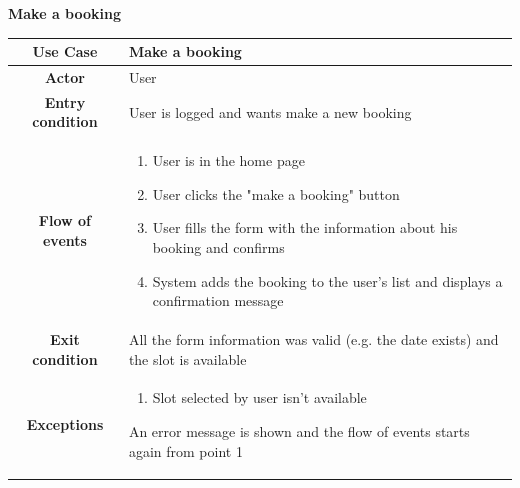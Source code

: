 \documentclass[table, 12pt]{article} %
\begin{document}
\begin{itemize}
            \begin{table}[H]
                \item[] \textbf{Make a booking}
                \item[]
                \centering
                \begin{tabular}{|c |m{}|}
                    \hline
                    \textbf{Use Case} & Make a booking\\ \hline
                    \textbf{Actor} & User\\ \hline
                    \textbf{Entry condition} & User is logged and wants make a new booking\\  \hline
                    \textbf{Flow of events} & \begin{enumerate}
                                                \item User is in the home page
                                                \item User clicks the "make a booking" button
                                                \item User fills the form with the information about his booking and confirms
                                                \item System adds the booking to the user's list and displays a confirmation message
                                            \end{enumerate}\\ \hline
                    \textbf{Exit condition} & All the form information was valid (e.g. the date exists) and the slot is available  \\ \hline
                    \textbf{Exceptions} &  \begin{enumerate}
                        \item Slot selected by user isn't available
                    \end{enumerate}
                    An error message is shown and the flow of events starts again from point 1\\ \hline
                \end{tabular}
            \end{table}


\end{itemize}
\end{document}

